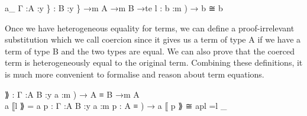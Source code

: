 \documentclass{acm_proc_article-sp}
\begin{document}
\begin{code}%
\>a\_ \AgdaBound{\{}Γ :\AgdaBound{\{}A :y \} :
         \AgdaBound{\{}B :y \} →m A →m B →te
 l : \AgdaBound{(}b :m ) → b ≅ b
\<%
\end{code}


Once we have heterogeneous equality for terms, we can define a proof-irrelevant substitution which we call coercion
since it gives us a term of type A if we have a term of type B and the
two types are equal. We can also prove that the coerced term is heterogeneously equal to the
original term. Combining these definitions, it is much
more convenient to formalise and reason about term equations.

\begin{code}%
\>⟫        : \AgdaBound{\{}Γ :\AgdaBound{\{}A B :y \AgdaBound{(}a :m ) 
            → A ≡ B →m A\<%
\\
\>a ⟦l ⟫  = a
p       : \AgdaBound{\{}Γ :\AgdaBound{\{}A B :y \AgdaBound{\{}a :m \AgdaBound{(}p : A ≡ ) 
            → a ⟦ p ⟫ ≅ apl  =l \_
\<%
\end{code}
\end{document}
